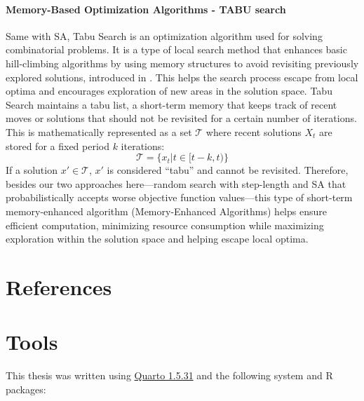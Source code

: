 \documentclass[
  a4paper,
  oneside,
  openany,
  12pt,
  onecolumn]{book}
\theoremstyle{definition}
\theoremstyle{plain}
\theoremstyle{remark}
\begin{document}
\subsubsection{Memory-Based Optimization Algorithms - TABU
search}\label{memory-based-optimization-algorithms---tabu-search}

Same with SA, Tabu Search is an optimization algorithm used for solving
combinatorial problems. It is a type of local search method that
enhances basic hill-climbing algorithms by using memory structures to
avoid revisiting previously explored solutions, introduced in
\citet{butler2013model}. This helps the search process escape from local
optima and encourages exploration of new areas in the solution space.
Tabu Search maintains a tabu list, a short-term memory that keeps track
of recent moves or solutions that should not be revisited for a certain
number of iterations. This is mathematically represented as a set
\(\mathcal{T}\) where recent solutions \(X_t\) are stored for a fixed
period \(k\) iterations: \[
\mathcal{T} = \{x_t|t \in [t-k,t)\}
\] If a solution \(x' \in \mathcal{T}\), \(x'\) is considered ``tabu''
and cannot be revisited. Therefore, besides our two approaches
here---random search with step-length and SA that probabilistically
accepts worse objective function values---this type of short-term
memory-enhanced algorithm (Memory-Enhanced Algorithms) helps ensure
efficient computation, minimizing resource consumption while maximizing
exploration within the solution space and helping escape local optima.


\chapter*{References}\label{references}


\renewcommand{\bibsection}{}


\cleardoublepage
{}
{}
\appendix

\chapter{Tools}\label{sec-tools}

This thesis was written using \href{https://quarto.org/}{Quarto 1.5.31}
\citep{quarto} and the following system and R packages:
\end{document}
